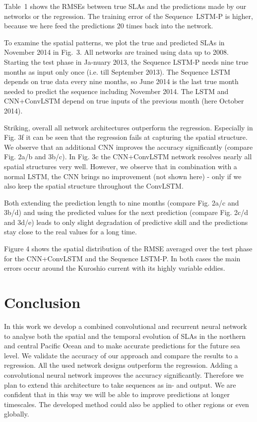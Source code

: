 \documentclass{article}
\begin{document}

Table~1 shows the RMSEs between true SLAs and the predictions made by our networks or the regression. The training error of the \mbox{Sequence LSTM-P} is higher, because we here feed the predictions 20 times back into the network.

To examine the spatial patterns, we plot the true and predicted SLAs in November 2014 in Fig.~3. All networks are trained using data up to 2008. Starting the test phase in Ja-nuary 2013, the Sequence LSTM-P needs nine true months as input only once (i.e. till September 2013). The Sequence LSTM depends on true data every nine months, so June 2014 is the last true month needed to predict the sequence including November 2014. The LSTM and CNN+ConvLSTM depend on true inputs of the previous month (here October 2014).

Striking, overall all network architectures outperform the regression. Especially in Fig. 3f it can be seen that the regression fails at capturing the spatial structure. We observe that an additional CNN improves the accuracy significantly (compare Fig. 2a/b and 3b/c). In Fig. 3c the CNN+ConvLSTM network resolves nearly all spatial structures very well. However, we observe that in combination with a normal LSTM, the CNN brings no improvement (not shown here) - only if we also keep the spatial structure throughout the ConvLSTM. 

Both extending the prediction length to nine months (compare Fig. 2a/c and 3b/d)  and using the predicted values for the next prediction (compare Fig. 2c/d and 3d/e) leads to only slight degradation of predictive skill and the predictions stay close to the real values for a long time.

Figure 4 shows the spatial distribution of the RMSE \linebreak averaged over the test phase for the CNN+ConvLSTM and the Sequence LSTM-P. In both cases the main errors occur around the Kuroshio current with its highly variable eddies.

\section{Conclusion}
\label{sec:print}

In this work we develop a combined convolutional and recurrent neural network to analyse both the spatial and the temporal evolution of SLAs in the northern and central Pacific Ocean and to make accurate predictions for the future sea level. We validate the accuracy of our approach and compare the results to a regression. All the used network designs outperform the regression. Adding a convolutional neural network improves the accuracy significantly.
Therefore we plan to extend this architecture to take sequences as in- and output. We are confident that in this way we will be able to improve predictions at longer timescales. The developed method could also be applied to other regions or even globally.
\end{document}
